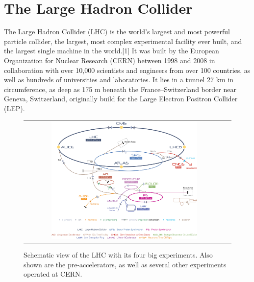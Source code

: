 

\section{The Large Hadron Collider}

The Large Hadron Collider (LHC) is the world's largest and most powerful particle collider, the largest, most complex experimental facility ever built, and the largest single machine in the world.[1] It was built by the European Organization for Nuclear Research (CERN) between 1998 and 2008 in collaboration with over 10,000 scientists and engineers from over 100 countries, as well as hundreds of universities and laboratories. It lies in a tunnel 27 km in circumference, as deep as 175 m beneath the France–Switzerland border near Geneva, Switzerland, originally build for the Large Electron Positron Collider (LEP). 

\begin{figure}[tbh!]
	\centering
	\begin{tabular}{cc}
		\includegraphics[width=0.75\textwidth]{detector/pics/CERN_complex.jpg}
	\end{tabular}
	\caption{Schematic view of the LHC with its four big experiments. Also shown are the pre-accelerators, as well as several other experiments operated at CERN.}
	\label{fig:CERN_complex}
\end{figure}

